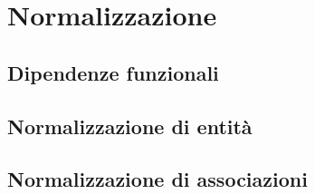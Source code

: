 \chapter{Normalizzazione}
\section{Dipendenze funzionali}
\section{Normalizzazione di entità}
\section{Normalizzazione di associazioni}
